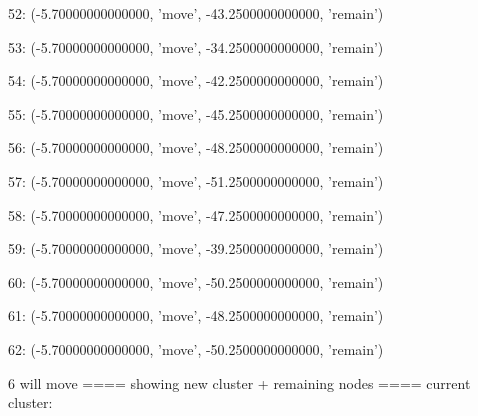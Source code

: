 52: (-5.70000000000000, 'move', -43.2500000000000, 'remain')


53: (-5.70000000000000, 'move', -34.2500000000000, 'remain')


54: (-5.70000000000000, 'move', -42.2500000000000, 'remain')


55: (-5.70000000000000, 'move', -45.2500000000000, 'remain')


56: (-5.70000000000000, 'move', -48.2500000000000, 'remain')


57: (-5.70000000000000, 'move', -51.2500000000000, 'remain')


58: (-5.70000000000000, 'move', -47.2500000000000, 'remain')


59: (-5.70000000000000, 'move', -39.2500000000000, 'remain')


60: (-5.70000000000000, 'move', -50.2500000000000, 'remain')


61: (-5.70000000000000, 'move', -48.2500000000000, 'remain')


62: (-5.70000000000000, 'move', -50.2500000000000, 'remain')


6 will move
==== showing new cluster + remaining nodes ====
current cluster:


